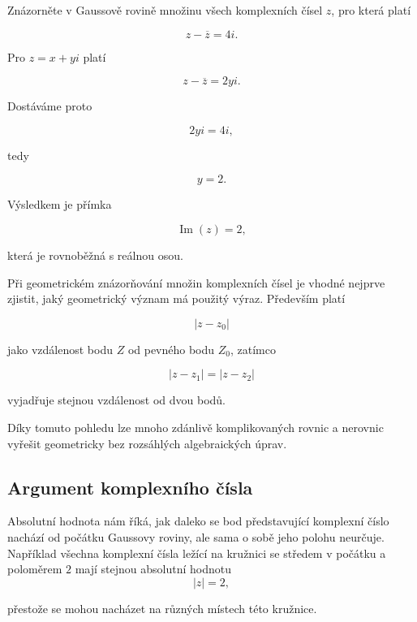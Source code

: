 \documentclass[12pt,a4paper]{article}
\begin{document}
\begin{examplebox}

Znázorněte v Gaussově rovině množinu všech komplexních čísel $z$, pro která platí

\[
    z-\overline{z}=4i.
\]

Pro $z=x+yi$ platí

\[
    z-\overline{z}=2yi.
\]

Dostáváme proto

\[
    2yi=4i,
\]

tedy

\[
    y=2.
\]

Výsledkem je přímka

\[
    \operatorname{Im}(z)=2,
\]

která je rovnoběžná s reálnou osou.

\end{examplebox}


\begin{notebox}

Při geometrickém znázorňování množin komplexních čísel je vhodné nejprve zjistit,
jaký geometrický význam má použitý výraz. Především platí

\[
    |z-z_0|
\]

jako vzdálenost bodu $Z$ od pevného bodu $Z_0$, zatímco

\[
    |z-z_1|=|z-z_2|
\]

vyjadřuje stejnou vzdálenost od dvou bodů.

Díky tomuto pohledu lze mnoho zdánlivě komplikovaných rovnic a nerovnic vyřešit
geometricky bez rozsáhlých algebraických úprav.

\end{notebox}



\subsection{Argument komplexního čísla}

Absolutní hodnota nám říká, jak daleko se bod představující komplexní číslo
nachází od počátku Gaussovy roviny, ale sama o sobě jeho polohu neurčuje.
Například všechna komplexní čísla ležící na kružnici se středem v počátku
a poloměrem $2$ mají stejnou absolutní hodnotu
\[
    |z|=2,
\]

přestože se mohou nacházet na různých místech této kružnice.
\end{document}
